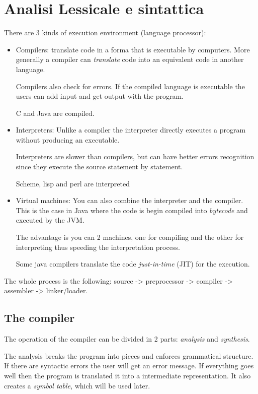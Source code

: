 \documentclass[12pt]{article}
\begin{document}
\section{Analisi Lessicale e sintattica}
There are 3 kinds of execution environment (language processor): 
\begin{itemize}
    \item Compilers: translate code in a forma that is executable by computers. More generally a compiler can \emph{translate} code into an equivalent code in another language. 

        Compilers also check for errors. If the compiled language is executable the users can add input and get output with the program.

        C and Java are compiled.
    \item Interpreters: Unlike a compiler the interpreter directly executes a program without producing an executable.

        Interpreters are slower than compilers, but can have better errors recognition since they execute the source statement by statement.

        Scheme, lisp and perl are interpreted

    \item Virtual machines: You can also combine the interpreter and the compiler. This is the case in Java where the code is begin compiled into \emph{bytecode} and executed by the JVM.

        The advantage is you can 2 machines, one for compiling and the other for interpreting thus speeding the interpretation process.

        Some java compilers translate the code \emph{just-in-time} (JIT) for the execution.
\end{itemize}

The whole process is the following: source -> preprocessor -> compiler -> assembler -> linker/loader.

\subsection{The compiler}
The operation of the compiler can be divided in 2 parts: \emph{analysis} and \emph{synthesis}. 

The analysis breaks the program into pieces and enforces grammatical structure.
If there are syntactic errors the user will get an error message.
If everything goes well then the program is translated it into a intermediate representation. 
It also creates a \emph{symbol table}, which will be used later.
\end{document}
